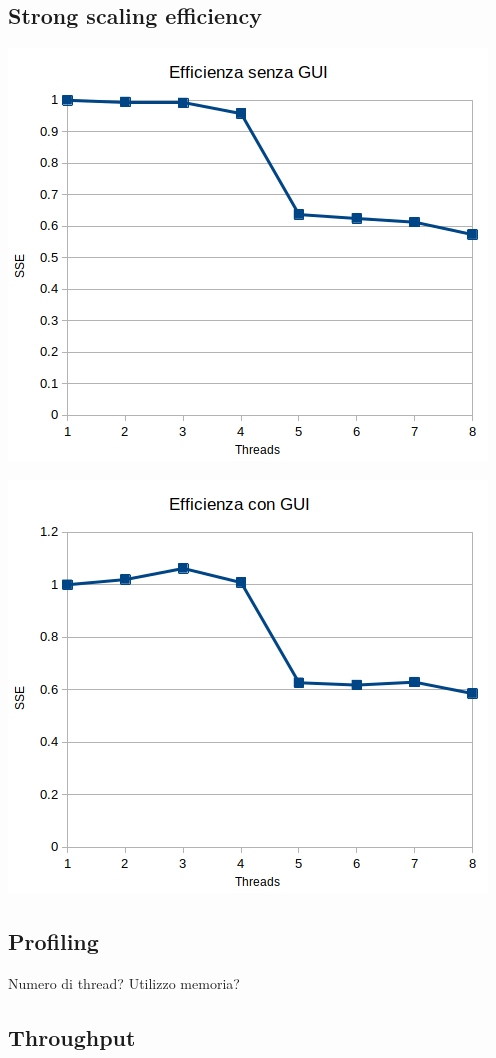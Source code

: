 \documentclass[12pt,a4paper,oneside]{article}
\begin{document}
	\subsection{Strong scaling efficiency}
	\hfill
	\begin{minipage}{.45\textwidth}
		\centering
		\includegraphics[width=\linewidth]{sse-no-gui}
		\label{fig:sse-no-gui}
	\end{minipage}
	\hfill
	\begin{minipage}{.45\textwidth}
		\centering
		\includegraphics[width=\linewidth]{sse-gui}
		\label{fig:sse-gui}
	\end{minipage}
	\hfill
	
	\subsection{Profiling}
	Numero di thread?
	Utilizzo memoria?
	\subsection{Throughput}
\end{document}

